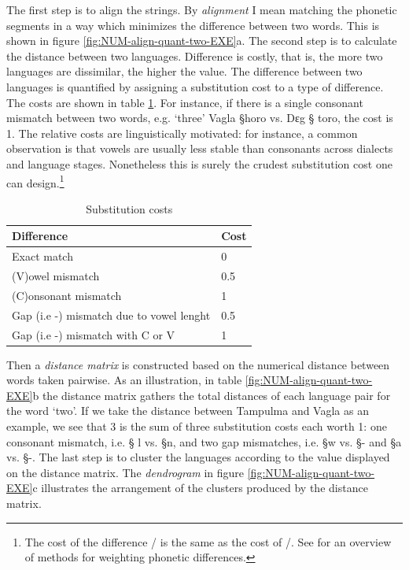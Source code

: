 
 The first step is to align the strings. By {\it alignment} I mean
matching the phonetic segments in a way which  minimizes the difference between
two
words.  This is shown in figure
\ref{fig:NUM-align-quant-two-EXE}a. The second step is to calculate the distance
between two languages. Difference is costly, that is,  the more two languages
are dissimilar, the higher the value.  The difference between two languages is
quantified by assigning a substitution cost to a type of difference. The costs
are shown in table \ref{tab:cod-sys}. For instance, if there is a single
consonant mismatch between two words,  e.g. `three'  Vagla {\S horo} vs. Dɛg {\S
toro}, the cost is 1.   The relative costs are linguistically motivated: for
instance, a common observation is that vowels are usually less stable than
consonants across dialects and language stages. Nonetheless this is surely the
crudest substitution cost one can design.\footnote{The cost of the difference
{\F [p]}/{\F [r]} is the same as the cost of  {\F [s]}/{\F [z]}. See
\cite{Heer02, Kond03} for an overview of methods for  weighting phonetic
differences.} 

\begin{table}[h!]
\caption{Substitution costs \label{tab:cod-sys}} 

\centering
\begin{tabular}{ll}
 Difference & Cost \\ \hline 
Exact match& 0 \\ 
(V)owel mismatch & 0.5 \\ 
(C)onsonant mismatch & 1 \\ 
Gap (i.e -) mismatch due to vowel lenght & 0.5\\
Gap (i.e -) mismatch with C or V & 1\\
 
      \end{tabular}

      \end{table}

Then a {\it distance matrix} is constructed based on the numerical distance
between   words taken pairwise.  As an illustration,  in table
\ref{fig:NUM-align-quant-two-EXE}b  the
distance matrix
gathers the total distances of each language pair for the word `two'.  If we
take the distance between Tampulma and Vagla as an example, we see that 3 is the
sum of three substitution costs each worth 1: one consonant mismatch, i.e. {\S
l} vs. {\S n}, and two gap mismatches, i.e.   {\S w} vs. {\S -} and {\S a} vs.
{\S -}. The last step is to cluster the languages according to the value
displayed on the distance matrix. The {\it dendrogram} in figure
\ref{fig:NUM-align-quant-two-EXE}c illustrates the arrangement of the clusters
produced by the distance matrix. 


